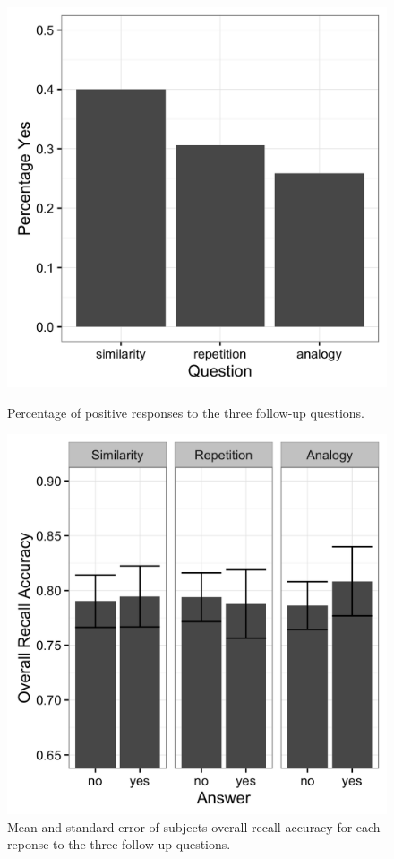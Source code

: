 \documentclass[a4paper,man,natbib,floatsintext,import]{apa6}
\begin{document}
\begin{figure}
\begin{minipage}[t]{.5\textwidth}
\includegraphics[width=.9\linewidth]{figures/fol_percYes.png}
\caption{Percentage of positive responses to the three follow-up questions.}
\label{fig:fol_percYes}
\end{minipage}
\begin{minipage}[t]{.5\textwidth}
\includegraphics[width=.9\linewidth]{figures/fol_answerXoverall.png}
\caption{Mean and standard error of subjects overall recall accuracy for each reponse to the three follow-up questions.}
\label{fig:fol_answerXoverall}
\end{minipage}
\end{figure}
\end{document}

